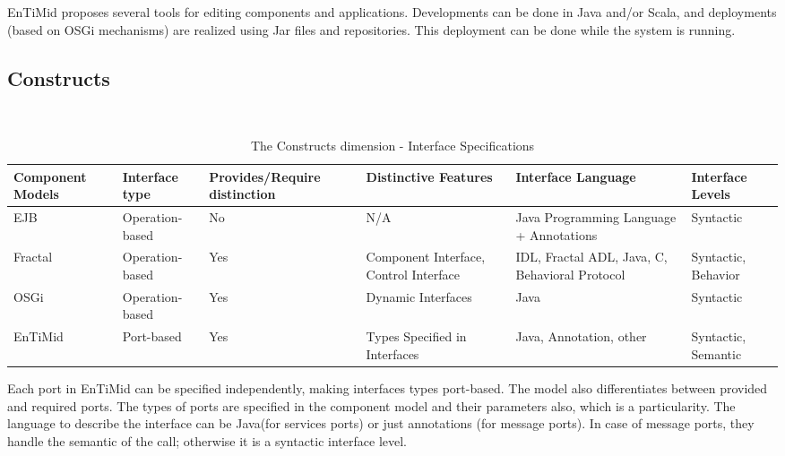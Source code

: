 EnTiMid proposes several tools for editing components and applications. Developments can be done in Java and/or Scala, and deployments (based on OSGi mechanisms) are realized using Jar files and repositories. This deployment can be done while the system is running.

\subsection{Constructs}
~
\vspace{-0,5cm}
\begin{table}[h!]
\centering
{\scriptsize 
\begin{tabular}{|>{\centering}m{}|| >{\centering}m{}| >{\centering}m{}| >{\centering}m{}| >{\centering}m{}| >{\centering\arraybackslash}m{}|}
\hline
Component Models & Interface type & Provides/Require distinction & Distinctive Features & Interface Language & Interface Levels \\
\hline
EJB & Operation-based & No & N/A & Java Programming Language + Annotations & Syntactic \\
\hline
Fractal & Operation-based & Yes & Component Interface, Control Interface & IDL, Fractal ADL, Java, C, Behavioral Protocol & Syntactic, Behavior \\
\hline
OSGi & Operation-based & Yes & Dynamic Interfaces & Java & Syntactic \\
\hline\hline
EnTiMid & Port-based & Yes & Types Specified in Interfaces & Java, Annotation, other & Syntactic, Semantic \\
\hline
\end{tabular}
}
\caption{The Constructs dimension - Interface Specifications}
\label{table:classifConstIface}
\end{table}

Each port in EnTiMid can be specified independently, making interfaces types port-based. The model also differentiates between provided and required ports. The types of ports are specified in the component model and their parameters also, which is a particularity. The language to describe the interface can be Java(for services ports) or just annotations (for message ports). In case of message ports, they handle the semantic of the call; otherwise it is a syntactic interface level.

